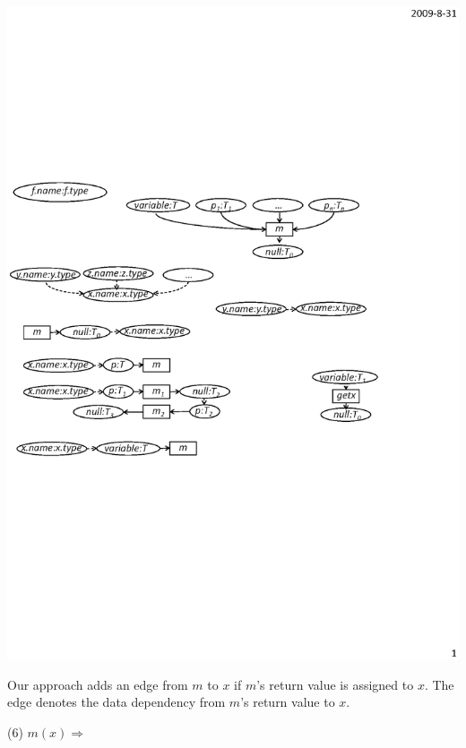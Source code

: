 \begin{center}
\includegraphics[scale=0.7,clip]{figure/rule5.eps}%
\end{center}

Our approach adds an edge from $m$ to $x$ if $m$'s return value is
assigned to $x$. The edge denotes the data dependency from $m$'s
return value to $x$.


(6) $m(x)\Rightarrow$

